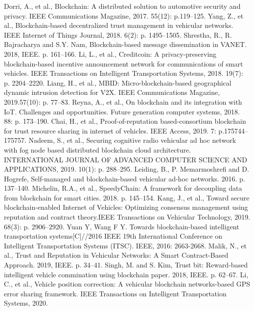 \begin{thebibliography}{99}
 Dorri, A., et al., Blockchain: A distributed solution to automotive security and privacy. IEEE Communications Magazine, 2017. 55(12): p.119–125.
 Yang, Z., et al., Blockchain-based decentralized trust management in vehicular networks. IEEE Internet of Things Journal, 2018. 6(2): p. 1495–1505.
 Shrestha, R., R. Bajracharya and S.Y. Nam, Blockchain-based message dissemination in VANET. 2018, IEEE. p. 161–166.
 Li, L., et al., Creditcoin: A privacy-preserving blockchain-based incentive announcement network for communications of smart vehicles. IEEE Transactions on Intelligent Transportation Systems, 2018. 19(7): p. 2204–2220.
 Liang, H., et al., MBID: Micro-blockchain-based geographical dynamic intrusion detection for V2X. IEEE Communications Magazine, 2019.57(10): p. 77–83.
 Reyna, A., et al., On blockchain and its integration with IoT. Challenges and opportunities. Future generation computer systems, 2018. 88: p. 173–190.
 Chai, H., et al., Proof-of-reputation based-consortium blockchain for trust resource sharing in internet of vehicles. IEEE Access, 2019. 7: p.175744–175757.
 Nadeem, S., et al., Securing cognitive radio vehicular ad hoc network with fog node based distributed blockchain cloud architecture. INTERNATIONAL JOURNAL OF ADVANCED COMPUTER SCIENCE AND APPLICATIONS, 2019. 10(1): p. 288–295.
 Leiding, B., P. Memarmoshreﬁ and D. Hogrefe, Self-managed and blockchain-based vehicular ad-hoc networks. 2016. p. 137–140.
 Michelin, R.A., et al., SpeedyChain: A framework for decoupling data from blockchain for smart cities. 2018. p. 145–154.
 Kang, J., et al., Toward secure blockchain-enabled Internet of Vehicles: Optimizing consensus management using reputation and contract theory.IEEE Transactions on Vehicular Technology, 2019. 68(3): p. 2906–2920.
 Yuan Y, Wang F Y. Towards blockchain-based intelligent transportation systems[C]//2016 IEEE 19th International Conference on Intelligent Transportation Systems (ITSC). IEEE, 2016: 2663-2668.
 Malik, N., et al., Trust and Reputation in Vehicular Networks: A Smart Contract-Based Approach. 2019, IEEE. p. 34–41.
 Singh, M. and S. Kim, Trust bit: Reward-based intelligent vehicle commination using blockchain paper. 2018, IEEE. p. 62–67.
 Li, C., et al., Vehicle position correction: A vehicular blockchain networks-based GPS error sharing framework. IEEE Transactions on Intelligent Transportation Systems, 2020.

\end{thebibliography}
